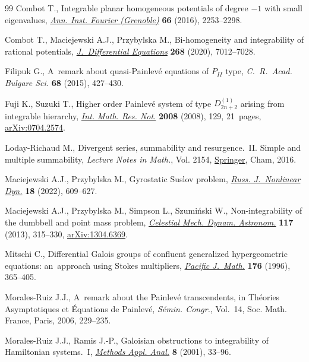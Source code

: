 \begin{thebibliography}{99}
Combot T., Integrable planar homogeneous potentials of degree {$-1$} with small
 eigenvalues, \href{https://doi.org/10.5802/aif.3063}{\textit{Ann. Inst. Fourier (Grenoble)}} \textbf{66} (2016),
 2253--2298.

Combot T., Maciejewski A.J., Przybylska M., Bi-homogeneity and integrability of
 rational potentials, \href{https://doi.org/10.1016/j.jde.2019.11.074}{\textit{J.~Differential Equations}} \textbf{268} (2020),
 7012--7028.

Filipuk G., A~remark about quasi-{P}ainlev\'e equations of {$P_{II}$} type,
 \textit{C.~R.~Acad. Bulgare Sci.} \textbf{68} (2015), 427--430.

Fuji K., Suzuki T., Higher order {P}ainlev\'e system of type {$D^{(1)}_{2n+2}$}
 arising from integrable hierarchy, \href{https://doi.org/10.1093/imrn/rnm129}{\textit{Int. Math. Res. Not.}}
 \textbf{2008} (2008), 129, 21~pages, \href{https://arxiv.org/abs/0704.2574}{arXiv:0704.2574}.

Loday-Richaud M., Divergent series, summability and resurgence.~{II}. {S}imple
 and multiple summability, \textit{Lecture Notes in Math.}, Vol. 2154,
 \href{https://doi.org/10.1007/978-3-319-29075-1}{Springer}, Cham, 2016.

Maciejewski A.J., Przybylska M., Gyrostatic {S}uslov problem, \href{https://doi.org/10.20537/nd221210}{\textit{Russ.
 J.~Nonlinear Dyn.}} \textbf{18} (2022), 609--627.

Maciejewski A.J., Przybylska M., Simpson L., Szumi\'nski W., Non-integrability
 of the dumbbell and point mass problem, \href{https://doi.org/10.1007/s10569-013-9514-7}{\textit{Celestial Mech. Dynam.
 Astronom.}} \textbf{117} (2013), 315--330, \href{https://arxiv.org/abs/1304.6369}{arXiv:1304.6369}.

Mitschi C., Differential {G}alois groups of confluent generalized
 hypergeometric equations: an~approach using {S}tokes multipliers,
 \href{https://doi.org/10.2140/pjm.1996.176.365}{\textit{Pacific J.~Math.}} \textbf{176} (1996), 365--405.

Morales-Ruiz J.J., A~remark about the {P}ainlev\'e transcendents, in Th\'eories
 Asymptotiques et \'Equations de {P}ainlev\'e, \textit{S\'emin. Congr.},
 Vol.~14, Soc. Math. France, Paris, 2006, 229--235.

Morales-Ruiz J.J., Ramis J.-P., Galoisian obstructions to integrability of
 {H}amiltonian systems.~{I}, \href{https://doi.org/10.4310/MAA.2001.v8.n1.a3}{\textit{Methods Appl. Anal.}} \textbf{8} (2001),
 33--96.


\end{thebibliography}
